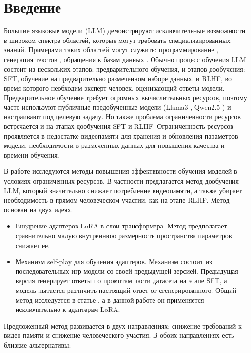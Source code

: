 \documentclass[12pt, twoside]{article}
\begin{document}
\section{Введение}
Большие языковые модели (LLM) демонстрируют исключительные возможности в широком спектре областей, которые могут требовать специализированных знаний. Примерами таких областей могут служить: программирование \parencite{Chen2021}, генерация текстов \parencite{Touvron2023}, обращения к базам данных \parencite{Zhong2017}. Обычно процесс обучения LLM состоит из нескольких этапов: предварительного обучения, и этапов дообучения: SFT, обучение на предварительно размеченном наборе данных, и RLHF, во время которого необходим эксперт-человек, оценивающий ответы модели. Предварительное обучение требует огромных вычислительных ресурсов, поэтому часто используют публичные предобученные модели (Llama3 \parencite{Dubey2024}, Qwen2.5 \parencite{Yang2025}) и настраивают под целевую задачу. Но также проблема ограниченности ресурсов встречается и на этапах дообучения SFT и RLHF. Ограниченность ресурсов проявляется в недостатке видеопамяти для хранения и обновления параметров модели, необходимости в размеченных данных для повышения качества и времени обучения.

В работе исследуются методы повышения эффективности обучения моделей в условиях ограниченных ресурсов. В частности предлагается метод дообучения LLM, который значительно снижает потребление видеопамяти, а также убирает необходимость в прямом человеческом участии, как на этапе RLHF. Метод основан на двух идеях. 

\begin{itemize}[label={}]
  \item Внедрение адаптеров LoRA в слои трансформера. Метод предполагает сравнительно малую внутреннюю размерность пространства параметров снижает ее. 
  
  \vspace{8}
   
  \item Механизм self-play для обучения адаптеров. Механизм состоит из последовательных игр модели со своей предыдущей версией. Предыдущая версия генерирует ответы по промптам части датасета на этапе SFT, а модель пытается различить настоящий ответ от сгенерированного. Общий метод исследуется в статье \parencite{Chen2024a}, а в данной работе он применяется исключительно к адаптерам LoRA. 
\end{itemize}

Предложенный метод развивается в двух направлениях: снижение требований к видео памяти и снижение человеческого участия. В обоих направлениях есть близкие альтернативы:
\end{document}
